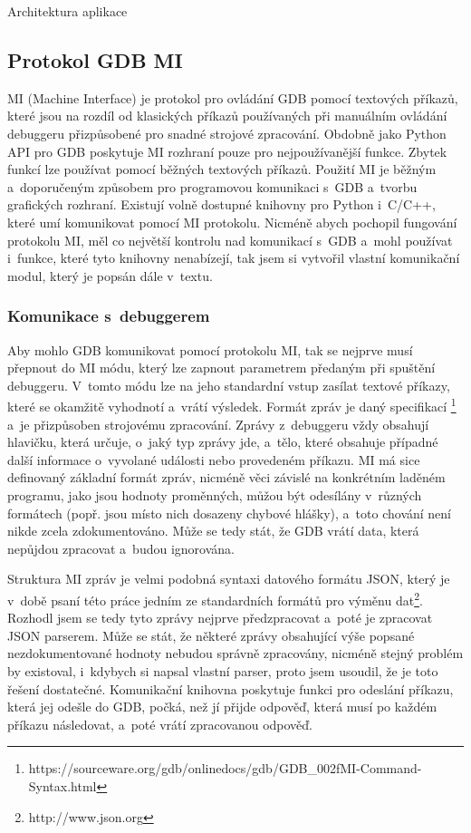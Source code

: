 \documentclass[czech,bachelor,male,python,dept460,hidelinks]{diploma}						%
\newcommand{\parspace}[1][]{
	\ifthenelse{\isempty{#1}}{\vspace{0mm}}{\vspace{#1}}
	\par
}
\begin{document}
\begin{section}{Architektura aplikace}
		\subsection{Protokol GDB MI}
		MI (Machine Interface) je protokol pro ovládání GDB pomocí textových příkazů, které jsou na rozdíl od klasických příkazů používaných při manuálním
		ovládání debuggeru přizpůsobené pro snadné strojové zpracování. Obdobně jako Python API pro GDB poskytuje MI rozhraní pouze pro nejpoužívanější funkce.
		Zbytek funkcí lze používat pomocí běžných textových příkazů. Použití MI je běžným a~doporučeným \cite{gdb-mi-usage} způsobem pro programovou komunikaci
		s~GDB a~tvorbu grafických rozhraní. Existují volně dostupné knihovny pro Python i~C/C++, které umí komunikovat pomocí MI protokolu.
		Nicméně abych pochopil fungování protokolu MI, měl co největší kontrolu nad komunikací s~GDB a~mohl používat i~funkce, které tyto knihovny nenabízejí, tak
		jsem si vytvořil vlastní komunikační modul, který je popsán dále v~textu.
		
		\subsubsection{Komunikace s~debuggerem}
			Aby mohlo GDB komunikovat pomocí protokolu MI, tak se nejprve musí přepnout do MI módu, který lze zapnout parametrem předaným při spuštění debuggeru.
			V~tomto módu lze na jeho standardní vstup zasílat textové příkazy, které se okamžitě vyhodnotí a~vrátí výsledek. Formát zpráv je daný specifikací
			\footnote{https://sourceware.org/gdb/onlinedocs/gdb/GDB\_002fMI-Command-Syntax.html} a~je přizpůsoben strojovému zpracování. Zprávy z~debuggeru
			vždy obsahují hlavičku, která určuje, o~jaký typ zprávy jde, a~tělo, které obsahuje případné další informace o~vyvolané události nebo
			provedeném příkazu. MI má sice definovaný základní formát zpráv, nicméně věci závislé na konkrétním laděném programu, jako jsou hodnoty proměnných,
			můžou být odesílány v~různých formátech (popř. jsou místo nich dosazeny chybové hlášky), a~toto chování není nikde zcela zdokumentováno.
			Může se tedy stát, že GDB vrátí data, která nepůjdou zpracovat a~budou ignorována.
			
			\parspace Struktura MI zpráv je velmi podobná syntaxi datového formátu JSON, který je v~době psaní této práce jedním ze standardních formátů pro výměnu
			dat\footnote{http://www.json.org}.
			Rozhodl jsem se tedy tyto zprávy nejprve předzpracovat a~poté je zpracovat JSON parserem. Může se stát, že některé zprávy obsahující výše popsané 
			nezdokumentované hodnoty nebudou správně zpracovány, nicméně stejný problém by existoval, i~kdybych si napsal vlastní parser, proto jsem usoudil, že je
			toto řešení dostatečné. Komunikační knihovna poskytuje funkci pro odeslání příkazu, která jej odešle do GDB, počká, než jí přijde odpověď, která musí po
			každém příkazu následovat, a~poté vrátí zpracovanou odpověď.
			

\end{section}
\end{document}
